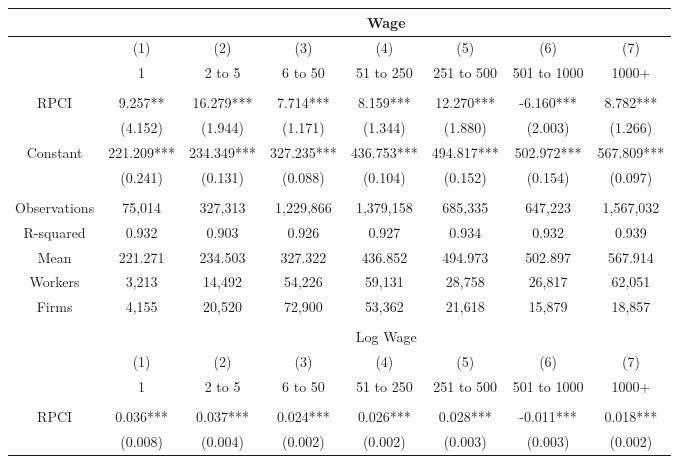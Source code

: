 \begin{tabular}{c|ccccccc}
\toprule
\toprule
      & \multicolumn{7}{c}{Wage} \\
\midrule
      & (1)   & (2)   & (3)   & (4)   & (5)   & (6)   & (7) \\
      & 1     & 2 to 5 & 6 to 50 & 51 to 250 & 251 to 500 & 501 to 1000 & 1000+ \\
\midrule
      &       &       &       &       &       &       &  \\
RPCI  & 9.257** & 16.279*** & 7.714*** & 8.159*** & 12.270*** & -6.160*** & 8.782*** \\
      & (4.152) & (1.944) & (1.171) & (1.344) & (1.880) & (2.003) & (1.266) \\
Constant & 221.209*** & 234.349*** & 327.235*** & 436.753*** & 494.817*** & 502.972*** & 567.809*** \\
      & (0.241) & (0.131) & (0.088) & (0.104) & (0.152) & (0.154) & (0.097) \\
      &       &       &       &       &       &       &  \\
\midrule
Observations & 75,014 & 327,313 & 1,229,866 & 1,379,158 & 685,335 & 647,223 & 1,567,032 \\
R-squared & 0.932 & 0.903 & 0.926 & 0.927 & 0.934 & 0.932 & 0.939 \\
Mean  & 221.271 & 234.503 & 327.322 & 436.852 & 494.973 & 502.897 & 567.914 \\
Workers & 3,213 & 14,492 & 54,226 & 59,131 & 28,758 & 26,817 & 62,051 \\
Firms & 4,155 & 20,520 & 72,900 & 53,362 & 21,618 & 15,879 & 18,857 \\
\midrule
\midrule
\multicolumn{1}{r}{} &       &       &       &       &       &       &  \\
\midrule
\midrule
      & \multicolumn{7}{c}{Log Wage} \\
\midrule
      & (1)   & (2)   & (3)   & (4)   & (5)   & (6)   & (7) \\
      & 1     & 2 to 5 & 6 to 50 & 51 to 250 & 251 to 500 & 501 to 1000 & 1000+ \\
\midrule
      &       &       &       &       &       &       &  \\
RPCI  & 0.036*** & 0.037*** & 0.024*** & 0.026*** & 0.028*** & -0.011*** & 0.018*** \\
      & (0.008) & (0.004) & (0.002) & (0.002) & (0.003) & (0.003) & (0.002) \\

\end{tabular}
